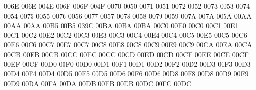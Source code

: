 \setcclcucx 006E 006E 004E %
\setcclcucx 006F 006F 004F %
 0070 0050 %
 0071 0051 %
 0072 0052 %
 0073 0053 %
 0074 0054 %
 0075 0055 %
 0076 0056 %
 0077 0057 %
 0078 0058 %
 0079 0059 %
\setcclcucx 007A 007A 005A %
\setcclcucx 00AA 00AA 00AA %
\setcclcucx 00B5 00B5 039C %
\setcclcucx 00BA 00BA 00BA %
\setcclcucx 00C0 00E0 00C0 %
\setcclcucx 00C1 00E1 00C1 %
\setcclcucx 00C2 00E2 00C2 %
\setcclcucx 00C3 00E3 00C3 %
\setcclcucx 00C4 00E4 00C4 %
\setcclcucx 00C5 00E5 00C5 %
\setcclcucx 00C6 00E6 00C6 %
\setcclcucx 00C7 00E7 00C7 %
\setcclcucx 00C8 00E8 00C8 %
\setcclcucx 00C9 00E9 00C9 %
\setcclcucx 00CA 00EA 00CA %
\setcclcucx 00CB 00EB 00CB %
\setcclcucx 00CC 00EC 00CC %
\setcclcucx 00CD 00ED 00CD %
\setcclcucx 00CE 00EE 00CE %
\setcclcucx 00CF 00EF 00CF %
\setcclcucx 00D0 00F0 00D0 %
\setcclcucx 00D1 00F1 00D1 %
\setcclcucx 00D2 00F2 00D2 %
\setcclcucx 00D3 00F3 00D3 %
\setcclcucx 00D4 00F4 00D4 %
\setcclcucx 00D5 00F5 00D5 %
\setcclcucx 00D6 00F6 00D6 %
\setcclcucx 00D8 00F8 00D8 %
\setcclcucx 00D9 00F9 00D9 %
\setcclcucx 00DA 00FA 00DA %
\setcclcucx 00DB 00FB 00DB %
\setcclcucx 00DC 00FC 00DC %
